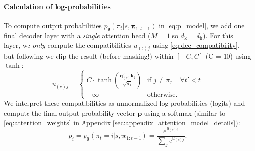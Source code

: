 \paragraph{Calculation of log-probabilities}
To compute output probabilities $p_{\bm{\theta}}(\pi_t|s, \bm{\pi}_{1:t-1})$ in \eqref{eq:p_model}, we add one final decoder layer with a \emph{single} attention head ($M=1$ so $d_{\text{k}} = d_{\text{h}}$). For this layer, we \emph{only} compute the compatibilities $u_{(c)j}$ using \eqref{eq:dec_compatibility}, but following \citet{bello2016neural} we clip the result (before masking!) within $[-C, C]$ (C = 10) using $\tanh$:
\begin{equation}
\label{eq:dec_logits}
	u_{(c)j} = \begin{cases}
		C \cdot \tanh \left(\frac{\mathbf{q}_{(c)}^T \mathbf{k}_j}{\sqrt{d_{\text{k}}}}\right) & \text{if } j \neq \pi_{t'} \quad \forall t' < t \\
        -\infty & \text{otherwise.}
    \end{cases}
\end{equation}
We interpret these compatibilities as unnormalized log-probabilities (logits) and compute the final output probability vector $\mathbf{p}$ using a softmax (similar to \eqref{eq:attention_weights} in Appendix \ref{sec:appendix_attention_model_details}):
\begin{equation}
	\label{dec:probabilities}
    p_i = p_{\bm{\theta}}(\pi_t = i|s, \bm{\pi}_{1:t-1}) = \frac{e^{u_{(c)i}}}{\sum_{j}{e^{u_{(c)j}}}}.
\end{equation}